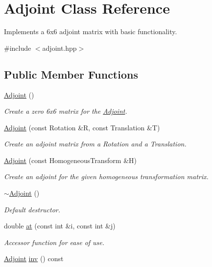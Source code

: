 \hypertarget{class_adjoint}{\section{Adjoint Class Reference}
\label{class_adjoint}
}


Implements a 6x6 adjoint matrix with basic functionality.  




{\ttfamily \#include $<$adjoint.\+hpp$>$}

\subsection*{Public Member Functions}
\begin{DoxyCompactItemize}
\item 
\hypertarget{class_adjoint_a3f7aa139d7726a6a01b995ce8d9811d8}{\hyperlink{class_adjoint_a3f7aa139d7726a6a01b995ce8d9811d8}{Adjoint} ()}\label{class_adjoint_a3f7aa139d7726a6a01b995ce8d9811d8}

\begin{DoxyCompactList}\small\item\em Create a zero 6x6 matrix for the \hyperlink{class_adjoint}{Adjoint}. \end{DoxyCompactList}\item 
\hyperlink{class_adjoint_ac41ccafac31c30023510cf12e761a192}{Adjoint} (const Rotation \&R, const Translation \&T)
\begin{DoxyCompactList}\small\item\em Create an adjoint matrix from a Rotation and a Translation. \end{DoxyCompactList}\item 
\hyperlink{class_adjoint_a363b30fee12fe21c843bb5cabf6655f2}{Adjoint} (const Homogeneous\+Transform \&H)
\begin{DoxyCompactList}\small\item\em Create an adjoint for the given homogeneous transformation matrix. \end{DoxyCompactList}\item 
\hypertarget{class_adjoint_ae7d182127cb44e0bd552f588eb04673b}{\hyperlink{class_adjoint_ae7d182127cb44e0bd552f588eb04673b}{$\sim$\+Adjoint} ()}\label{class_adjoint_ae7d182127cb44e0bd552f588eb04673b}

\begin{DoxyCompactList}\small\item\em Default destructor. \end{DoxyCompactList}\item 
double \hyperlink{class_adjoint_ad7ee6b3bcbc5e51ba5295d9722330a8e}{at} (const int \&i, const int \&j)
\begin{DoxyCompactList}\small\item\em Accessor function for ease of use. \end{DoxyCompactList}\item 
\hypertarget{class_adjoint_ae5cac302619067e4df66a518d16ec061}{\hyperlink{class_adjoint}{Adjoint} \hyperlink{class_adjoint_ae5cac302619067e4df66a518d16ec061}{inv} () const }\label{class_adjoint_ae5cac302619067e4df66a518d16ec061}


\end{DoxyCompactItemize}

